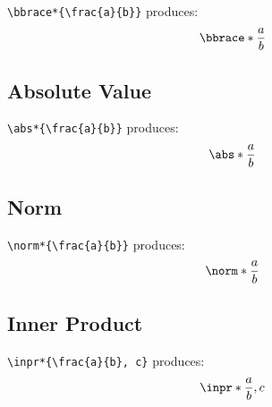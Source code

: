 \documentclass[12pt]{article}
\begin{document}
\texttt{\textbackslash bbrace*\{\textbackslash frac\{a\}\{b\}\}} produces:
\[
  \bbrace*{\frac{a}{b}}
\]

\subsection*{Absolute Value}

\texttt{\textbackslash abs*\{\textbackslash frac\{a\}\{b\}\}} produces:
\[
  \abs*{\frac{a}{b}}
\]

\subsection*{Norm}

\texttt{\textbackslash norm*\{\textbackslash frac\{a\}\{b\}\}} produces:
\[
  \norm*{\frac{a}{b}}
\]

\subsection*{Inner Product}

\texttt{\textbackslash inpr*\{\textbackslash frac\{a\}\{b\}, c\}} produces:
\[
  \inpr*{\frac{a}{b}, c}
\]


\appendix

\newpage
\printbibliography
\end{document}
